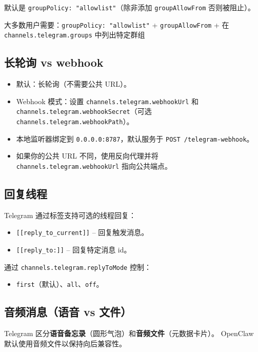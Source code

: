 默认是 \texttt{groupPolicy: "allowlist"}（除非添加 \texttt{groupAllowFrom} 否则被阻止）。

大多数用户需要：\texttt{groupPolicy: "allowlist"} + \texttt{groupAllowFrom} + 在 \texttt{channels.telegram.groups} 中列出特定群组

\subsection{长轮询 vs webhook}


\begin{itemize}
  \item 默认：长轮询（不需要公共 URL）。
  \item Webhook 模式：设置 \texttt{channels.telegram.webhookUrl} 和 \texttt{channels.telegram.webhookSecret}（可选 \texttt{channels.telegram.webhookPath}）。
  \item 本地监听器绑定到 \texttt{0.0.0.0:8787}，默认服务于 \texttt{POST /telegram-webhook}。
  \item 如果你的公共 URL 不同，使用反向代理并将 \texttt{channels.telegram.webhookUrl} 指向公共端点。
\end{itemize}


\subsection{回复线程}


Telegram 通过标签支持可选的线程回复：

\begin{itemize}
  \item \texttt{[[reply\_to\_current]]} -- 回复触发消息。
  \item \texttt{[[reply\_to:]]} -- 回复特定消息 id。
\end{itemize}


通过 \texttt{channels.telegram.replyToMode} 控制：

\begin{itemize}
  \item \texttt{first}（默认）、\texttt{all}、\texttt{off}。
\end{itemize}


\subsection{音频消息（语音 vs 文件）}


Telegram 区分\textbf{语音备忘录}（圆形气泡）和\textbf{音频文件}（元数据卡片）。
OpenClaw 默认使用音频文件以保持向后兼容性。

